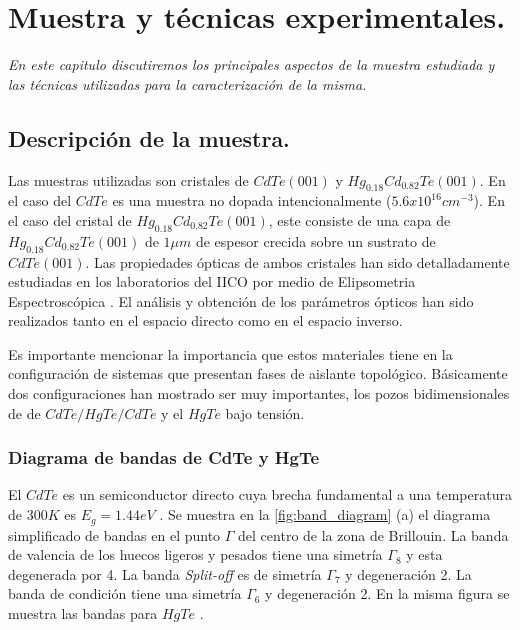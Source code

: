 \chapter{Muestra y técnicas experimentales.}

\label{chap:techniques-and-sample}
\textit{En este capitulo discutiremos los principales aspectos de la muestra estudiada y las técnicas utilizadas para la 
caracterización de la misma.}
\vfill
\minitoc
\newpage

\section{Descripción de la muestra.}
\label{sec:chap3-sample-description}
Las muestras utilizadas son cristales de $ CdTe(001) $ y $ Hg_{0.18}Cd_{0.82}Te (001)$. En el caso del $ CdTe $ es una 
muestra no dopada intencionalmente ($ 5.6x10^{16} cm^{-3} $). En el caso del cristal de $ Hg_{0.18}Cd_{0.82}Te (001)$, este 
consiste de una capa de $ Hg_{0.18}Cd_{0.82}Te (001)$ de $ 1 \mu m $ de espesor crecida sobre un sustrato de $ CdTe(001) $. 
Las propiedades ópticas de ambos cristales han sido detalladamente estudiadas en los laboratorios del IICO por medio de 
Elipsometria Espectroscópica \cite{Camacho2005}\cite{LastrasMartnez2009}. El análisis y obtención de los parámetros ópticos 
han sido realizados tanto en el espacio directo como en el espacio inverso\cite{Camacho2005}\cite{LastrasMartnez2009}.

Es importante mencionar la importancia que estos materiales tiene en la configuración de sistemas que presentan fases de 
aislante topológico. Básicamente dos configuraciones han mostrado ser muy importantes, los pozos bidimensionales de de 
$ CdTe/HgTe/CdTe $ y el $ HgTe $ bajo tensión.

\subsection{Diagrama de bandas de CdTe y HgTe}
\label{sec:chap3-band-diagram}
El $ CdTe $ es un semiconductor directo cuya brecha fundamental a una temperatura de $300 K $ es $ E_{g}=1.44 eV $ 
\cite{Kittel2004-yd}\cite{Chadi1972}. Se muestra en la \ref{fig:band_diagram} (a) el diagrama simplificado de bandas en el 
punto $ \Gamma $ del centro de la zona de Brillouin\cite{Chadi1972}. La banda de valencia de los huecos ligeros y pesados 
tiene una simetría $ \Gamma_{8} $ y esta degenerada por 4. La banda \textit{Split-off} es de simetría $ \Gamma_{7} $ y 
degeneración 2. La banda de condición tiene una simetría  $ \Gamma_{6} $ y degeneración 2. En la misma figura se muestra 
las bandas para $ HgTe $ \cite{Chadi1972}.


